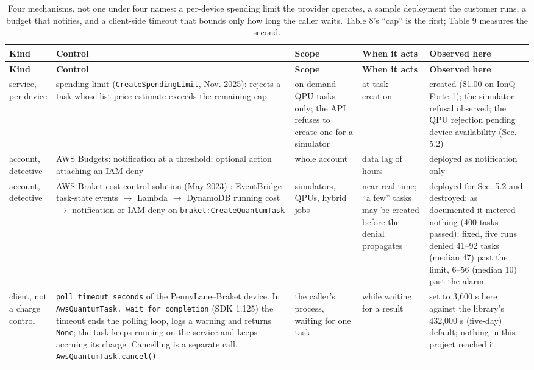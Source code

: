 \documentclass[acmsmall,screen,review]{acmart}
\begin{document}
\begingroup
\small
\setlength\LTleft{\fill}
\setlength\LTright{\fill}
\begin{xltabular}{\textwidth}{>{\hsize}Y>{\hsize}Y>{\hsize}Y>{\hsize}Y>{\hsize}Y}
\caption{Four mechanisms, not one under four names: a per-device spending limit the provider operates, a sample deployment the customer runs, a budget that notifies, and a client-side timeout that bounds only how long the caller waits. Table 8's ``cap'' is the first; Table 9 measures the second.}\label{tab:1} \\
\toprule
\textbf{Kind} & \textbf{Control} & \textbf{Scope} & \textbf{When it acts} & \textbf{Observed here} \\
\midrule
\endfirsthead
\toprule
\textbf{Kind} & \textbf{Control} & \textbf{Scope} & \textbf{When it acts} & \textbf{Observed here} \\
\midrule
\endhead
\endfoot
\bottomrule
\endlastfoot
service, per device & spending limit (\texttt{Create\allowbreak{}Spending\allowbreak{}Limit}, Nov. 2025): rejects a task whose list-price estimate exceeds the remaining cap & on-demand QPU tasks only; the API refuses to create one for a simulator & at task creation & created (\$1.00 on IonQ Forte-1); the simulator refusal observed; the QPU rejection pending device availability (Sec. 5.2) \\
account, detective & AWS Budgets: notification at a threshold; optional action attaching an IAM deny & whole account & data lag of hours & deployed as notification only \\
account, detective & AWS Braket cost-control solution (May 2023) \cite{ref1}: EventBridge task-state events $\rightarrow$ Lambda $\rightarrow$ DynamoDB running cost $\rightarrow$ notification or IAM deny on \texttt{braket:\allowbreak{}Create\allowbreak{}Quantum\allowbreak{}Task} & simulators, QPUs, hybrid jobs & near real time; ``a few'' tasks may be created before the denial propagates & deployed for Sec. 5.2 and destroyed: as documented it metered nothing (400 tasks passed); fixed, five runs denied 41--92 tasks (median 47) past the limit, 6--56 (median 10) past the alarm \\
client, not a charge control & \texttt{poll\_\allowbreak{}timeout\_\allowbreak{}seconds} of the PennyLane--Braket device. In \texttt{Aws\allowbreak{}Quantum\allowbreak{}Task.\allowbreak{}\_\allowbreak{}wait\_\allowbreak{}for\_\allowbreak{}completion} (SDK 1.125) the timeout ends the polling loop, logs a warning and returns \texttt{None}; the task keeps running on the service and keeps accruing its charge. Cancelling is a separate call, \texttt{Aws\allowbreak{}Quantum\allowbreak{}Task.\allowbreak{}cancel()} & the caller's process, waiting for one task & while waiting for a result & set to 3,600 s here against the library's 432,000 s (five-day) default; nothing in this project reached it \\
\end{xltabular}
\endgroup
\end{document}
